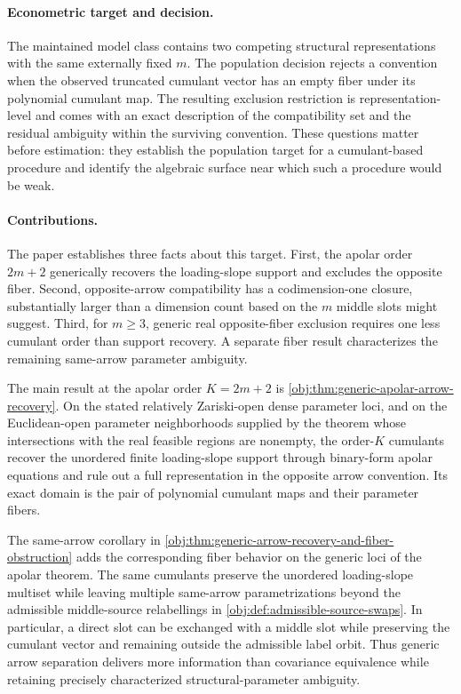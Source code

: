 \paragraph{Econometric target and decision.}
The maintained model class contains two competing structural representations with the same externally fixed \(m\). The population decision rejects a convention when the observed truncated cumulant vector has an empty fiber under its polynomial cumulant map. The resulting exclusion restriction is representation-level and comes with an exact description of the compatibility set and the residual ambiguity within the surviving convention. These questions matter before estimation: they establish the population target for a cumulant-based procedure and identify the algebraic surface near which such a procedure would be weak.

\paragraph{Contributions.}
The paper establishes three facts about this target. First, the apolar order \(2m+2\) generically recovers the loading-slope support and excludes the opposite fiber. Second, opposite-arrow compatibility has a codimension-one closure, substantially larger than a dimension count based on the \(m\) middle slots might suggest. Third, for \(m\ge3\), generic real opposite-fiber exclusion requires one less cumulant order than support recovery. A separate fiber result characterizes the remaining same-arrow parameter ambiguity.

The main result at the apolar order \(K=2m+2\) is \cref{obj:thm:generic-apolar-arrow-recovery}. On the stated relatively Zariski-open dense parameter loci, and on the Euclidean-open parameter neighborhoods supplied by the theorem whose intersections with the real feasible regions are nonempty, the order-\(K\) cumulants recover the unordered finite loading-slope support through binary-form apolar equations and rule out a full representation in the opposite arrow convention. Its exact domain is the pair of polynomial cumulant maps and their parameter fibers.

The same-arrow corollary in \cref{obj:thm:generic-arrow-recovery-and-fiber-obstruction} adds the corresponding fiber behavior on the generic loci of the apolar theorem. The same cumulants preserve the unordered loading-slope multiset while leaving multiple same-arrow parametrizations beyond the admissible middle-source relabellings in \cref{obj:def:admissible-source-swaps}. In particular, a direct slot can be exchanged with a middle slot while preserving the cumulant vector and remaining outside the admissible label orbit. Thus generic arrow separation delivers more information than covariance equivalence while retaining precisely characterized structural-parameter ambiguity.

